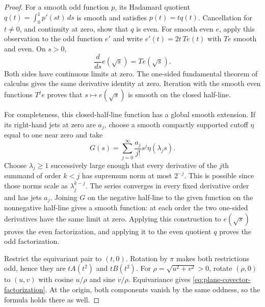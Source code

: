 \documentclass[11pt]{article}
\begin{document}
\begin{proof}
For a smooth odd function $p$, its Hadamard quotient
$q(t)=\int_0^1p'(st)\,ds$ is smooth and satisfies $p(t)=tq(t)$.
Cancellation for $t\ne0$, and continuity at zero, show that $q$ is even.
For smooth even $e$, apply this observation to the odd function $e'$ and
write $e'(t)=2t\,Te(t)$ with $Te$ smooth and even. On $s>0$,
\[
 \frac{d}{ds}e(\sqrt{s})=Te(\sqrt{s}).
\]
Both sides have continuous limits at zero. The one-sided fundamental theorem
of calculus gives the same derivative identity at zero. Iteration with the
smooth even functions $T^je$ proves that $s\mapsto e(\sqrt{s})$ is smooth
on the closed half-line.

For completeness, this closed-half-line function has a global smooth
extension. If its right-hand jets at zero are $a_j$, choose a smooth compactly
supported cutoff $\eta$ equal to one near zero and take
\[
 G(s)=\sum_{j=0}^\infty \frac{a_j}{j!}s^j\eta(\lambda_j s).
\]
Choose $\lambda_j\geq1$ successively large enough that every derivative
of the $j$th summand of order $k<j$ has supremum norm at most $2^{-j}$.
This is possible since those norms scale as $\lambda_j^{k-j}$.
The series converges in every fixed derivative order and has jets $a_j$.
Joining $G$ on the negative half-line to the given function on the
nonnegative half-line gives a smooth function: at each order the two
one-sided derivatives have the same limit at zero. Applying this construction
to $e(\sqrt{s})$ proves the even factorization, and applying it to the even
quotient $q$ proves the odd factorization.

Restrict the equivariant pair to $(t,0)$. Rotation by $\pi$ makes both
restrictions odd, hence they are $tA(t^2)$ and $tB(t^2)$. For
$\rho=\sqrt{u^2+v^2}>0$, rotate $(\rho,0)$ to $(u,v)$ with cosine
$u/\rho$ and sine $v/\rho$. Equivariance gives
\eqref{eq:plane-covector-factorization}. At the origin, both components
vanish by the same oddness, so the formula holds there as well.
\end{proof}
\end{document}

